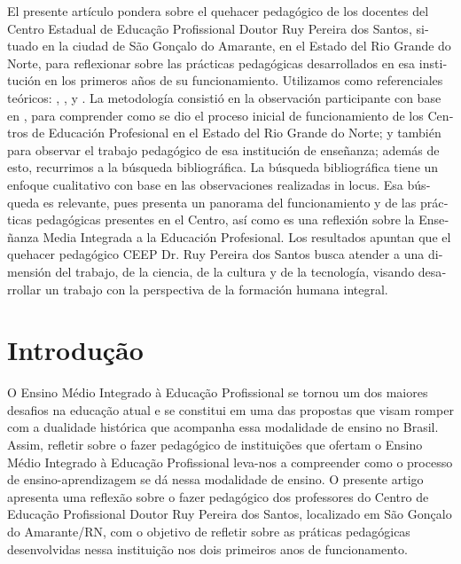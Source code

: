 \begin{refsection}
\begin{otherlanguage}{spanish}
    \begin{galoResumo}[Resumen]
        El presente artículo pondera sobre el quehacer pedagógico de los docentes del Centro Estadual de Educação Profissional Doutor Ruy Pereira dos Santos, situado en la ciudad de São Gonçalo do Amarante, en el Estado del Rio Grande do Norte, para reflexionar sobre las prácticas pedagógicas desarrollados en esa institución en los primeros años de su funcionamiento. Utilizamos como referenciales teóricos: \textcite{CIAVATTA2005formação}, \textcite{RAMOS2005Possibilidades,RAMOS2008Concepção}, \textcite{DANTE2010AlgumasPossibilidades} y \textcite{FREIRE1996Pedagogia}. La metodología consistió en la observación participante con base en \textcite{MINAYO2007desafio}, para comprender como se dio el proceso inicial de funcionamiento de los Centros de Educación Profesional en el Estado del Rio Grande do Norte; y también para observar el trabajo pedagógico de esa institución de enseñanza; además de esto, recurrimos a la búsqueda bibliográfica. La búsqueda bibliográfica tiene un enfoque cualitativo con base en las observaciones realizadas in locus. Esa búsqueda es relevante, pues presenta un panorama del funcionamiento y de las prácticas pedagógicas presentes en el Centro, así como es una reflexión sobre la Enseñanza Media Integrada a la Educación Profesional. Los resultados apuntan que el quehacer pedagógico CEEP Dr. Ruy Pereira dos Santos busca atender a una dimensión del trabajo, de la ciencia, de la cultura y de la tecnología, visando desarrollar un trabajo con la perspectiva de la formación humana integral.  
    \end{galoResumo}
    
    \end{otherlanguage}

    \section{Introdução}

    O Ensino Médio Integrado à Educação Profissional se tornou um dos maiores desafios na educação atual e se constitui em uma das propostas que visam romper com a dualidade histórica que acompanha essa modalidade de ensino no Brasil. Assim, refletir sobre o fazer pedagógico de instituições que ofertam o Ensino Médio Integrado à Educação Profissional leva-nos a compreender como o processo de ensino-aprendizagem se dá nessa modalidade de ensino. O presente artigo apresenta uma reflexão sobre o fazer pedagógico dos professores do Centro de Educação Profissional Doutor Ruy Pereira dos Santos, localizado em São Gonçalo do Amarante/RN, com o objetivo de refletir sobre as práticas pedagógicas desenvolvidas nessa instituição nos dois primeiros anos de funcionamento. 


\end{refsection}
